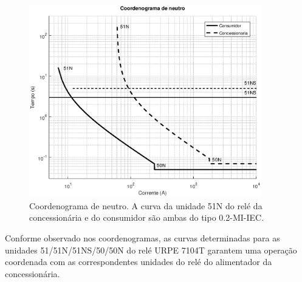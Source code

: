 \begin{figure}[H] 
    \centering
    \includegraphics[width=0.9\textwidth]{images/neutro.eps}
    \caption{Coordenograma de neutro. A curva da unidade 51N do relé da concessionária e do consumidor são ambas do tipo 0.2-MI-IEC.}
    \label{fig:neutro}
\end{figure}

Conforme observado nos coordenogramas, as curvas determinadas para as unidades 51/51N/51NS/50/50N do relé URPE 7104T garantem uma operação coordenada com as correspondentes unidades do relé do alimentador da concessionária.
